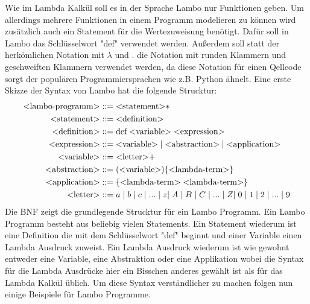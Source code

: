 \documentclass[ngerman]{article}
\begin{document}
Wie im Lambda Kalkül soll es in der Sprache Lambo nur Funktionen geben. 
Um allerdings mehrere Funktionen in einem Programm modelieren zu können wird zusätzlich auch ein Statement für die Wertezuweisung benötigt. Dafür soll in Lambo das Schlüsselwort "def" verwendet werden. Außerdem soll statt der herkömlichen Notation mit $\lambda$ und . die Notation mit runden Klammern und geschweiften Klammern verwendet werden, da diese Notation für einen Qellcode sorgt der populären Programmiersprachen wie z.B. Python ähnelt.
Eine erste Skizze der Syntax von Lambo hat die folgende Strucktur:
\begin{align*}
    \text{\textless lambo-programm\textgreater} & ::= \text{\textless statement\textgreater}* \\
    \text{\textless statement\textgreater} & ::= \text{\textless definition\textgreater} \\
    \text{\textless definition\textgreater} & ::= \text{def} \; \text{\textless variable\textgreater} \; \text{\textless expression\textgreater}\\
    \text{\textless expression\textgreater} & ::= \text{\textless variable\textgreater} \; | \; \text{\textless abstraction\textgreater} \; | \; \text{\textless application\textgreater}\\
    \text{\textless variable\textgreater} & ::= \text{\textless letter\textgreater +} \\
    \text{\textless abstraction\textgreater} & ::= (\text{\textless variable\textgreater})\{\text{\textless lambda-term\textgreater}\}\\
    \text{\textless application\textgreater} & ::= \{\text{\textless lambda-term\textgreater} \; \text{\textless lambda-term\textgreater}\} \\
    \text{\textless letter\textgreater} & ::= a \; | \; b \; | \; c \; | \; ... \; | \; z | \; A \; | \; B \; | \; C \; | \; ... \; | \; Z | \; 0 \; | \; 1 \; | \; 2 \; | \; ... \; | \; 9
\end{align*}
Die BNF zeigt die grundlegende Strucktur für ein Lambo Programm. Ein Lambo Programm besteht aus beliebig vielen Statements. Ein Statement wiederum ist eine Definition die mit dem Schlüsselwort "def" beginnt und einer Variable einen Lambda Ausdruck zuweist. Ein Lambda Ausdruck wiederum ist wie gewohnt entweder eine Variable, eine Abstraktion oder eine Applikation wobei die Syntax für die Lambda Ausdrücke hier ein Bisschen anderes gewählt ist als für das Lambda Kalkül üblich. Um diese Syntax verständlicher zu machen folgen nun einige Beispiele für Lambo Programme. \\ \\
\end{document}
